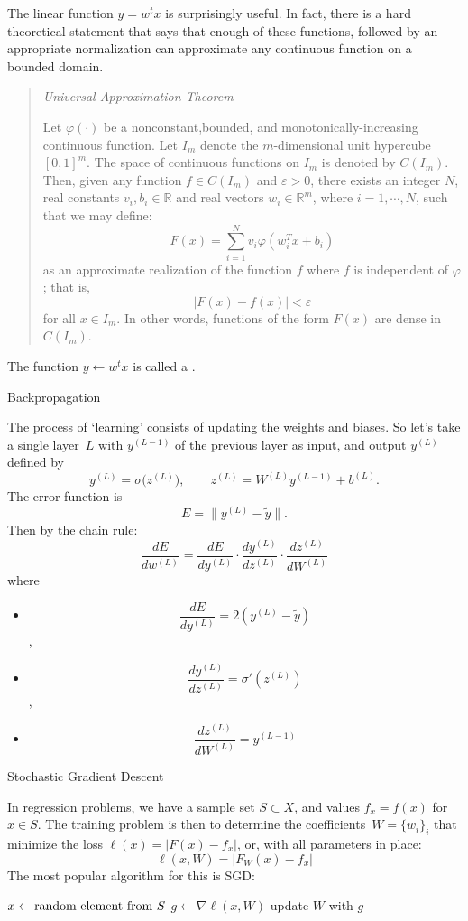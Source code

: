 The linear function $y=w^tx$ is surprisingly useful. In fact, there is
a hard theoretical statement that says that enough of these functions,
followed by an appropriate normalization can approximate any
continuous function on a bounded domain.

\begin{quotation}
  \textsl{Universal Approximation Theorem}%

  Let $\varphi(\cdot)$ be a nonconstant,bounded, and
  monotonically-increasing continuous function. Let $I_m$ denote the
  $m$-dimensional unit hypercube $[0,1]^m$. The space
  of continuous functions on $I_m$ is denoted by
  $C(I_m)$. Then, given any function $f\in C(I_m)$
  and $\varepsilon>0$, there exists an integer
  $N$, real constants $v_i,b_i\in\mathbb{R}$ and
  real vectors $w_i \in \mathbb{R}^m$, where
  $i=1,\cdots,N$, such that we may define:
  \[
  F( x ) =
  \sum_{i=1}^{N} v_i \varphi \left( w_i^T x + b_i\right)
  \]
  as an approximate realization of the function $f$ where
  $f$ is independent of $\varphi$; that is,
  \[
  | F( x ) - f ( x ) | < \varepsilon
  \]
  for all $x\in I_m$. In other words, functions of the form
  $F(x)$ are dense in $C(I_m)$.
\end{quotation}

The function $y\leftarrow w^tx$ is called a .

 {Backpropagation}

The process of `learning' consists of updating the weights and biases.
So let's take a single layer~$L$ with $y^{(L-1)}$ of the previous layer
as input, and output $y^{(L)}$ defined by
\[ y^{(L)} = \sigma\bigl( z^{(L)} \bigr),\qquad
z^{(L)}=W^{(L)}y^{(L-1)}+b^{(L)}. \]
The error function is
\[ E= \| y^{(L)}-\tilde y \|. \]
Then by the chain rule:
\[ \frac{dE}{dw^{(L)}} = \frac{dE}{dy^{(L)}}\cdot
\frac{dy^{(L)}}{dz^{(L)}}\cdot
\frac{dz^{(L)}}{dW^{(L)}} \]
where
\begin{itemize}
\item \[ \frac{dE}{dy^{(L)}} = 2(y^{(L)}-\tilde y) \],
\item \[ \frac{dy^{(L)}}{dz^{(L)}} = \sigma'(z^{(L)}) \],
\item \[ \frac{dz^{(L)}}{dW^{(L)}} = y^{(L-1)} \]
\end{itemize}

 {Stochastic Gradient Descent}

In regression problems, we have a sample set $S\subset X$, and values
$f_x=f(x)$ for $x\in S$. The training problem is then to determine the
coefficients~$W=\{w_i\}_i$ that minimize the loss $\ell(x)=|F(x)-f_x|$,
or, with all parameters in place:
\[ \ell(x,W) = |F_W(x)-f_x| \]
The most popular algorithm for this is \acf{SGD}:
%
\begin{displayalgorithm}
        { $x\leftarrow\hbox{random element from $S$}$\;
          $g\leftarrow\nabla \ell(x,W)$\;
          update $W$ with $g$\;
          }
\end{displayalgorithm}


